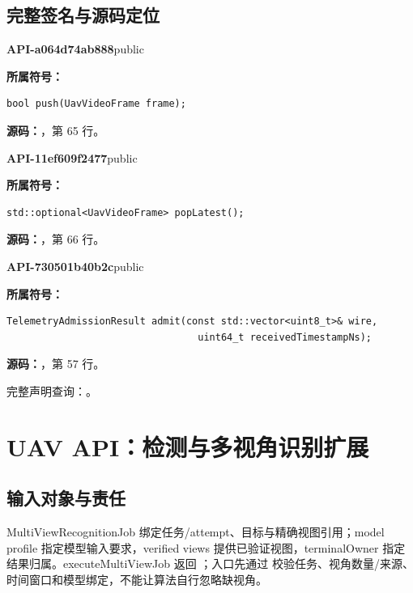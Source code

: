 \subsection{完整签名与源码定位}

\textbf{API-a064d74ab888}\quad public\par
\textbf{所属符号：}\par
\begin{Verbatim}[fontsize=\footnotesize,breaklines,breakanywhere]
bool push(UavVideoFrame frame);
\end{Verbatim}
\textbf{源码：}，第 65 行。\par

\textbf{API-11ef609f2477}\quad public\par
\textbf{所属符号：}\par
\begin{Verbatim}[fontsize=\footnotesize,breaklines,breakanywhere]
std::optional<UavVideoFrame> popLatest();
\end{Verbatim}
\textbf{源码：}，第 66 行。\par

\textbf{API-730501b40b2c}\quad public\par
\textbf{所属符号：}\par
\begin{Verbatim}[fontsize=\footnotesize,breaklines,breakanywhere]
TelemetryAdmissionResult admit(const std::vector<uint8_t>& wire,
                                 uint64_t receivedTimestampNs);
\end{Verbatim}
\textbf{源码：}，第 57 行。\par

完整声明查询：。

\section{UAV API：检测与多视角识别扩展}

\subsection{输入对象与责任}
MultiViewRecognitionJob 绑定任务/attempt、目标与精确视图引用；model profile 指定模型输入要求，verified views 提供已验证视图，terminalOwner 指定结果归属。executeMultiViewJob 返回 ；入口先通过  校验任务、视角数量/来源、时间窗口和模型绑定，不能让算法自行忽略缺视角。

